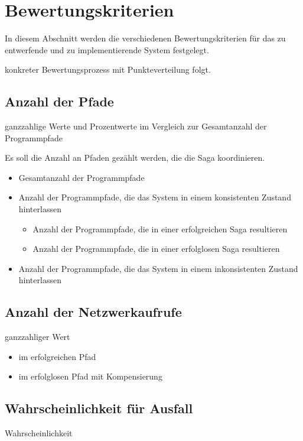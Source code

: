 \section{Bewertungskriterien}

In diesem Abschnitt werden die verschiedenen Bewertungskriterien für das zu entwerfende und zu implementierende System festgelegt. 

konkreter Bewertungsprozess mit Punkteverteilung folgt. %

\subsection{Anzahl der Pfade}
ganzzahlige Werte und Prozentwerte im Vergleich zur Gesamtanzahl der Programmpfade

Es soll die Anzahl an Pfaden gezählt werden, die die Saga koordinieren. 

\begin{itemize}
	\item Gesamtanzahl der Programmpfade
	\item Anzahl der Programmpfade, die das System in einem konsistenten Zustand hinterlassen
		\begin{itemize}
			\item Anzahl der Programmpfade, die in einer erfolgreichen Saga resultieren
			\item Anzahl der Programmpfade, die in einer erfolglosen Saga resultieren
		\end{itemize}
	\item Anzahl der Programmpfade, die das System in einem inkonsistenten Zustand hinterlassen
\end{itemize}


\subsection{Anzahl der Netzwerkaufrufe}
ganzzahliger Wert

\begin{itemize}
	\item im erfolgreichen Pfad
	\item im erfolglosen Pfad mit Kompensierung
\end{itemize}

\subsection{Wahrscheinlichkeit für Ausfall}
Wahrscheinlichkeit

